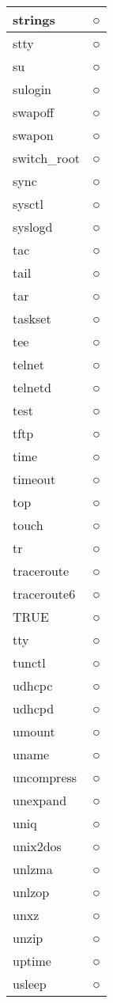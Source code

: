 \begin{longtable}{p{80mm}p{80mm}}
strings & ○ \\ \hline
stty & ○ \\ \hline
su & ○ \\ \hline
sulogin & ○ \\ \hline
swapoff & ○ \\ \hline
swapon & ○ \\ \hline
switch\_root & ○ \\ \hline
sync & ○ \\ \hline
sysctl & ○ \\ \hline
syslogd & ○ \\ \hline
tac & ○ \\ \hline
tail & ○ \\ \hline
tar & ○ \\ \hline
taskset & ○ \\ \hline
tee & ○ \\ \hline
telnet & ○ \\ \hline
telnetd & ○ \\ \hline
test & ○ \\ \hline
tftp & ○ \\ \hline
time & ○ \\ \hline
timeout & ○ \\ \hline
top & ○ \\ \hline
touch & ○ \\ \hline
tr & ○ \\ \hline
traceroute & ○ \\ \hline
traceroute6 & ○ \\ \hline
TRUE & ○ \\ \hline
tty & ○ \\ \hline
tunctl & ○ \\ \hline
udhcpc & ○ \\ \hline
udhcpd & ○ \\ \hline
umount & ○ \\ \hline
uname & ○ \\ \hline
uncompress & ○ \\ \hline
unexpand & ○ \\ \hline
uniq & ○ \\ \hline
unix2dos & ○ \\ \hline
unlzma & ○ \\ \hline
unlzop & ○ \\ \hline
unxz & ○ \\ \hline
unzip & ○ \\ \hline
uptime & ○ \\ \hline
usleep & ○ \\ \hline

\end{longtable}
